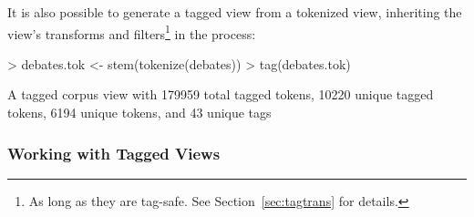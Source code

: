 \documentclass[11pt]{article}
\begin{document}
It is also possible to generate a tagged view from a tokenized view,
inheriting the view's transforms and filters\footnote{As long as they
are tag-safe.  See Section~\ref{sec:tagtrans} for details.} in the process:
\begin{Schunk}
\begin{Sinput}
> debates.tok <- stem(tokenize(debates))
> tag(debates.tok)
\end{Sinput}
\begin{Soutput}
A tagged corpus view with 179959 total tagged tokens,
 10220 unique tagged tokens, 6194 unique tokens, and 43 unique tags
\end{Soutput}
\end{Schunk}

\subsubsection{Working with Tagged Views}
\end{document}
